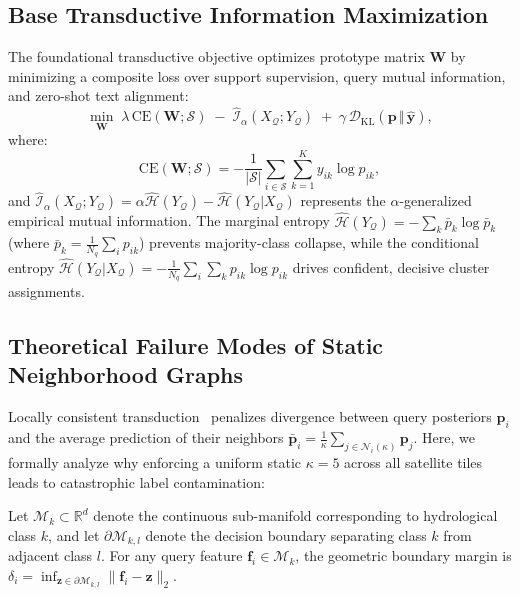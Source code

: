 \subsection{Base Transductive Information Maximization}
The foundational transductive objective optimizes prototype matrix $\mathbf{W}$ by minimizing a composite loss over support supervision, query mutual information, and zero-shot text alignment:
\begin{equation}
    \min_{\mathbf{W}} \; \lambda\,\mathrm{CE}(\mathbf{W}; \mathcal{S}) \;-\; \hat{\mathcal{I}}_{\alpha}(X_{\mathcal{Q}}; Y_{\mathcal{Q}}) \;+\; \gamma\,\mathcal{D}_{\mathrm{KL}}(\bm{p} \,\Vert\, \hat{\bm{y}}),
    \label{eq:tim_base}
\end{equation}
where:
\begin{equation}
    \mathrm{CE}(\mathbf{W}; \mathcal{S}) = -\frac{1}{|\mathcal{S}|}\sum_{i \in \mathcal{S}} \sum_{k=1}^K y_{ik} \log p_{ik},
\end{equation}
and $\hat{\mathcal{I}}_{\alpha}(X_{\mathcal{Q}}; Y_{\mathcal{Q}}) = \alpha \hat{\mathcal{H}}(Y_{\mathcal{Q}}) - \hat{\mathcal{H}}(Y_{\mathcal{Q}}|X_{\mathcal{Q}})$ represents the $\alpha$-generalized empirical mutual information. The marginal entropy $\hat{\mathcal{H}}(Y_{\mathcal{Q}}) = -\sum_k \bar{p}_k \log \bar{p}_k$ (where $\bar{p}_k = \frac{1}{N_q}\sum_i p_{ik}$) prevents majority-class collapse, while the conditional entropy $\hat{\mathcal{H}}(Y_{\mathcal{Q}}|X_{\mathcal{Q}}) = -\frac{1}{N_q}\sum_i \sum_k p_{ik} \log p_{ik}$ drives confident, decisive cluster assignments.

\subsection{Theoretical Failure Modes of Static Neighborhood Graphs}
Locally consistent transduction~\cite{elkhoury2026lctim} penalizes divergence between query posteriors $\bm{p}_i$ and the average prediction of their neighbors $\bar{\bm{p}}_i = \frac{1}{\kappa}\sum_{j \in \mathcal{N}_i(\kappa)} \bm{p}_j$. Here, we formally analyze why enforcing a uniform static $\kappa=5$ across all satellite tiles leads to catastrophic label contamination:

\begin{definition}
Let $\mathcal{M}_k \subset \mathbb{R}^d$ denote the continuous sub-manifold corresponding to hydrological class $k$, and let $\partial \mathcal{M}_{k, l}$ denote the decision boundary separating class $k$ from adjacent class $l$. For any query feature $\bm{f}_i \in \mathcal{M}_k$, the geometric boundary margin is $\delta_i = \inf_{\bm{z} \in \partial \mathcal{M}_{k, l}} \lVert \bm{f}_i - \bm{z} \rVert_2$.
\end{definition}

